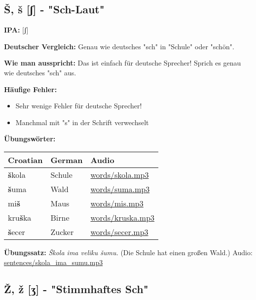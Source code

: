 \subsection{Š, š [ʃ] - "Sch-Laut"}

\begin{tcolorbox}[breakable, colback=lightblue!30, colframe=croatianblue, title=\textbf{Š, š}]

\textbf{IPA:} [ʃ]

\textbf{Deutscher Vergleich:}
Genau wie deutsches "sch" in "Schule" oder "schön".

\textbf{Wie man ausspricht:}
Das ist einfach für deutsche Sprecher! Sprich es genau wie deutsches "sch" aus.

\textbf{Häufige Fehler:}
\begin{itemize}
    \item Sehr wenige Fehler für deutsche Sprecher!
    \item Manchmal mit "s" in der Schrift verwechselt
\end{itemize}

\textbf{Übungswörter:}
\begin{center}
\small
\begin{tabular}{lll}
\textbf{Croatian} & \textbf{German} & \textbf{Audio} \\
\midrule
\textbf{š}kola & Schule & \small\url{words/skola.mp3} \\
\textbf{š}uma & Wald & \small\url{words/suma.mp3} \\
mi\textbf{š} & Maus & \small\url{words/mis.mp3} \\
kru\textbf{š}ka & Birne & \small\url{words/kruska.mp3} \\
\textbf{š}ecer & Zucker & \small\url{words/secer.mp3} \\
\end{tabular}
\end{center}

\textbf{Übungssatz:}
\textit{Škola ima veliku šumu.}
(Die Schule hat einen großen Wald.)
Audio: \small\url{sentences/skola\_ima\_sumu.mp3}

\end{tcolorbox}

\subsection{Ž, ž [ʒ] - "Stimmhaftes Sch"}

